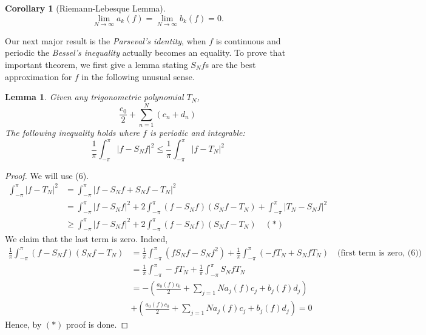 \documentclass[12pt]{amsart}
\newtheorem{corollary}[theorem]{Corollary}
\newtheorem{lemma}[theorem]{Lemma}
\theoremstyle{definition}
\begin{document}
\begin{corollary}[Riemann-Lebesque Lemma]
    \[
    \lim_{N \to \infty}a_k(f) = \lim_{N \to \infty}b_k(f) = 0.
    \]
\end{corollary}


Our next major result is the \textit{Parseval's identity}, when $f$ is continuous and periodic the \textit{Bessel's inequality} actually becomes an equality. To prove that important theorem, we first give a lemma stating $S_Nf$s are the best approximation for $f$ in the following unusual sense\footnotemark{}.




\begin{lemma}
    Given any trigonometric polynomial $T_N$,
    \[
    \frac{c_0}{2} + \sum_{n=1}^{N} (c_n + d_n)
    \]
    The following inequality holds where $f$ is periodic and integrable:
    \[
    \frac{1}{\pi} \int_{-\pi}^{\pi}\left| f - S_Nf\right|^2 \leq \frac{1}{\pi} \int_{-\pi}^{\pi}\left| f - T_N\right|^2
    \]
\end{lemma}


\begin{proof}
    We will use (6).
    \[
    \begin{aligned}
        \int_{-\pi}^{\pi}\left| f - T_N\right|^2
        &= \int_{-\pi}^{\pi}\left| f - S_Nf + S_Nf - T_N\right|^2\\
        &=  \int_{-\pi}^{\pi} \left| f - S_Nf\right|^2
        + 2 \int_{-\pi}^{\pi}  (f - S_Nf)(S_Nf - T_N)
        + \int_{-\pi}^{\pi} \left| T_N - S_Nf\right|^2 \\
        &\geq \int_{-\pi}^{\pi} \left| f - S_Nf\right|^2
        + 2 \int_{-\pi}^{\pi}  (f - S_Nf)(S_Nf - T_N)  \quad(\ast)
    \end{aligned}
    \]
    We claim that the last term is zero. Indeed,
    \[
    \begin{aligned}
        \frac{1}{\pi}\int_{-\pi}^{\pi}  (f - S_Nf)(S_Nf - T_N)
        &= \frac{1}{\pi} \int_{-\pi}^{\pi}  (fS_Nf - S_Nf^2) + \frac{1}{\pi} \int_{-\pi}^{\pi} (-fT_N + S_NfT_N) \quad \text{(first term is zero, (6))}\\
        &= \frac{1}{\pi} \int_{-\pi}^{\pi} -fT_N + \frac{1}{\pi} \int_{-\pi}^{\pi}  S_NfT_N\\
        &= -\left( \frac{a_0(f)c_0}{2} + \sum_{j=1}{N}a_j(f)c_j + b_j(f)d_j\right) \\
        &+ \left( \frac{a_0(f)c_0}{2} + \sum_{j=1}{N}a_j(f)c_j + b_j(f)d_j\right) = 0
    \end{aligned}
    \]
    Hence, by $(\ast)$ proof is done.
\end{proof}
\end{document}
